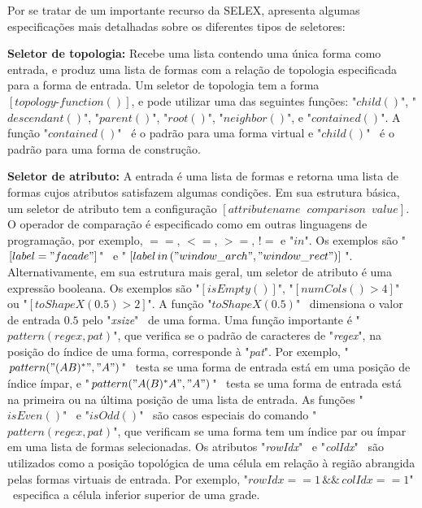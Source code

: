 \begin{figure}[h!]
	\centering
	\captionsetup{width=15cm}
	{}	
\end{figure}

Por se tratar de um importante recurso da \gls{SELEX},  apresenta algumas especificações mais detalhadas sobre os diferentes tipos de seletores:

\textbf{Seletor de topologia:} Recebe uma lista contendo uma única forma como entrada, e produz uma lista de formas com a relação de topologia especificada para a forma de entrada. Um seletor de topologia tem a forma $[topology\mbox{-}function()]$, e pode utilizar uma das seguintes funções: "$child()$", "$descendant()$", "$parent()$", "$root()$", "$neighbor()$", e "$contained()$". A função "$contained()$" \, é o padrão para uma forma virtual e "$child()$" \, é o padrão para uma forma de construção.

\textbf{Seletor de atributo:} A entrada é uma lista de formas e retorna uma lista de formas cujos atributos satisfazem algumas condições. Em sua estrutura básica, um seletor de atributo tem a configuração $[attributename \;\; comparison \:\; value]$. O operador de comparação é especificado como em outras linguagens de programação, por exemplo, $==$, $<=$, $>=$, $!=$ e "$in$". Os exemplos são "$[label="facade"]$" \, e "$[label \, in \, ("window\_arch", "window\_rect")]$". Alternativamente, em sua estrutura mais geral, um seletor de atributo é uma expressão booleana. Os exemplos são "$[isEmpty()]$", "$[numCols()>4]$" \, ou "$[toShapeX(0.5)>2]$". A função "$toShapeX(0.5)$" \, dimensiona o valor de entrada $0.5$ pelo "\textit{xsize}" \, de uma forma. Uma função importante é "$pattern(regex, pat)$", que verifica se o padrão de caracteres de "\textit{regex}", na posição do índice de uma forma, corresponde à "\textit{pat}". Por exemplo, "$pattern("(AB)^*","A")$" \, testa se uma forma de entrada está em uma posição de índice ímpar, e "$pattern("A(B)^*A","A")$" \, testa se uma forma de entrada está na primeira ou na última posição de uma lista de entrada. As funções "$isEven()$" \, e "$isOdd()$" \, são casos especiais do comando "$pattern(regex, pat)$", que verificam se uma forma tem um índice par ou ímpar em uma lista de formas selecionadas. Os atributos "\textit{rowIdx}" \, e "\textit{colIdx}" \, são utilizados como a posição topológica de uma célula em relação à região abrangida pelas formas virtuais de entrada. Por exemplo, "$rowIdx==1 \, \&\& \, colIdx==1$" \, especifica a célula inferior superior de uma grade. 

